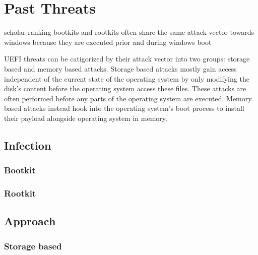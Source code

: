 
\chapter{Past Threats}


scholar ranking
bootkits and rootkits often share the same attack vector towards windows because they are executed prior and during windows boot

UEFI threats can be catigorized by their attack vector into two groups: storage based and memory based attacks. Storage based attacks mostly gain access independent of the current state of the operating system by only modifying the disk's content before the operating system access these files. These attacks are often performed before any parts of the operating system are executed. Memory based attacks instead hook into the operating system's boot process to install their payload alongside operating system in memory.

\section{Infection}


\subsection{Bootkit}

\subsection{Rootkit}

\section{Approach}
\subsection{Storage based}


